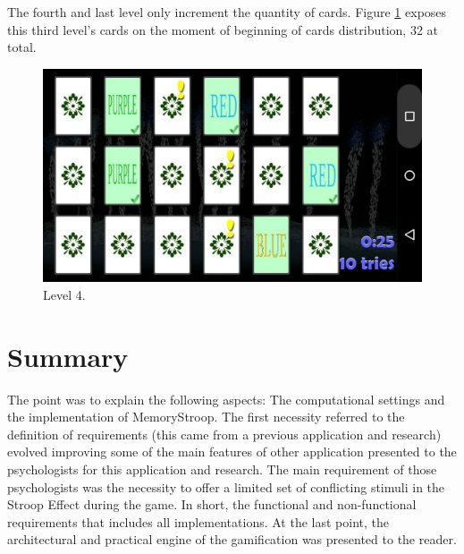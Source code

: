 The fourth and last level only increment the quantity of cards. Figure \ref{lv4} exposes this third level's cards on the moment of beginning of cards distribution, 32 at total.

						\begin{figure}[htp]
							\begin{center}
								\includegraphics[scale=0.25]{chapters/desenvolvimento/img/memorystroop4.jpg}
								\caption{Level 4.}
								\label{lv4}
							\end{center}
						\end{figure}


\section{Summary}
		
The point was to explain the following aspects: The computational settings and the implementation of MemoryStroop. The first necessity referred to the definition of requirements (this came from a previous application and research) evolved improving some of the main features of other application presented to the psychologists for this application and research. The main requirement of those psychologists was the necessity to offer a limited set of conflicting stimuli in the Stroop Effect during the game. In short, the functional and non-functional  requirements that includes all implementations.  At the last point, the architectural and practical engine of the gamification was presented to the reader.